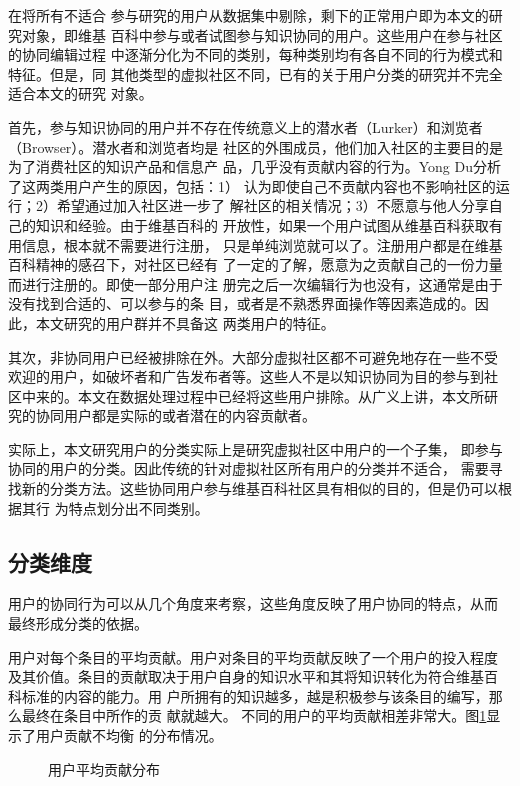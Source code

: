在将所有不适合
参与研究的用户从数据集中剔除，剩下的正常用户即为本文的研究对象，即维基
百科中参与或者试图参与知识协同的用户。这些用户在参与社区的协同编辑过程
中逐渐分化为不同的类别，每种类别均有各自不同的行为模式和特征。但是，同
其他类型的虚拟社区不同，已有的关于用户分类的研究并不完全适合本文的研究
对象。

首先，参与知识协同的用户并不存在传统意义上的潜水者（Lurker）和浏览者
（Browser）。潜水者和浏览者均是
社区的外围成员，他们加入社区的主要目的是为了消费社区的知识产品和信息产
品，几乎没有贡献内容的行为。Yong Du分析了这两类用户产生的原因，包括：1）
认为即使自己不贡献内容也不影响社区的运行；2）希望通过加入社区进一步了
解社区的相关情况；3）不愿意与他人分享自己的知识和经验\cite{4052703}。由于维基百科的
开放性，如果一个用户试图从维基百科获取有用信息，根本就不需要进行注册，
只是单纯浏览就可以了。注册用户都是在维基百科精神的感召下，对社区已经有
了一定的了解，愿意为之贡献自己的一份力量而进行注册的。即使一部分用户注
册完之后一次编辑行为也没有，这通常是由于没有找到合适的、可以参与的条
目，或者是不熟悉界面操作等因素造成的。因此，本文研究的用户群并不具备这
两类用户的特征。

其次，非协同用户已经被排除在外。大部分虚拟社区都不可避免地存在一些不受
欢迎的用户，如破坏者和广告发布者等。这些人不是以知识协同为目的参与到社
区中来的。本文在数据处理过程中已经将这些用户排除。从广义上讲，本文所研
究的协同用户都是实际的或者潜在的内容贡献者。

实际上，本文研究用户的分类实际上是研究虚拟社区中用户的一个子集，
即参与协同的用户的分类。因此传统的针对虚拟社区所有用户的分类并不适合，
需要寻找新的分类方法。这些协同用户参与维基百科社区具有相似的目的，但是仍可以根据其行
为特点划分出不同类别。

\subsection{分类维度}
\label{sec:dimension}
用户的协同行为可以从几个角度来考察，这些角度反映了用户协同的特点，从而
最终形成分类的依据。

用户对每个条目的平均贡献。用户对条目的平均贡献反映了一个用户的投入程度
及其价值。条目的贡献取决于用户自身的知识水平和其将知识转化为符合维基百
科标准的内容的能力。用
户所拥有的知识越多，越是积极参与该条目的编写，那么最终在条目中所作的贡
献就越大。
不同的用户的平均贡献相差非常大。图\ref{con-detri}显示了用户贡献不均衡
的分布情况。
\begin{figure}
  \label{con-detri}
  \centering
  \caption{\small{用户平均贡献分布}}
\end{figure}

